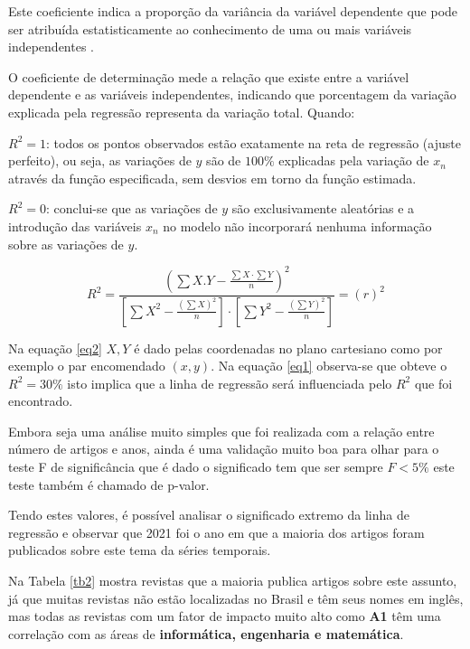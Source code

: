 Este coeficiente indica a proporção da variância da variável dependente que pode ser atribuída estatisticamente ao conhecimento de uma ou mais variáveis independentes . 

O coeficiente de determinação mede a relação que existe entre a variável dependente e as variáveis independentes, indicando que porcentagem da variação explicada pela regressão representa da variação total. Quando:

$R^2=1$: todos os pontos observados estão exatamente na reta de regressão (ajuste perfeito), ou seja, as variações de $y$ são de $100\%$ explicadas pela variação de $x_n$ através da função especificada, sem desvios em torno da função estimada. 

$R^2=0$: conclui-se que as variações de $y$ são exclusivamente aleatórias e a introdução das variáveis $x_n$ no modelo não incorporará nenhuma informação sobre as variações de $y$.

\begin{equation}
	R^{2}=\frac{\left(\sum X . Y-\frac{\sum X \cdot \sum Y}{n}\right)^{2}}{\left[\sum X^{2}-\frac{\left(\sum X\right)^{2}}{n}\right] \cdot\left[\sum Y^{2}-\frac{\left(\sum Y\right)^{2}}{n}\right]}=(r)^{2}\label{eq2}
\end{equation}

Na equação \eqref{eq2} $X,Y$ é dado pelas coordenadas no plano cartesiano como por exemplo o par encomendado $(x,y)$. 
Na equação \eqref{eq1} observa-se que obteve o $R^2=30\%$ isto implica que a linha de regressão será influenciada pelo $R^2$ que foi encontrado.

Embora seja uma análise muito simples que foi realizada com a relação entre número de artigos e anos, ainda é uma validação muito boa para olhar para o teste F de significância que é dado o significado tem que ser sempre $F<5\%$ este teste também é chamado de p-valor.

Tendo estes valores, é possível analisar o significado extremo da linha de regressão e observar que 2021 foi o ano em que a maioria dos artigos foram publicados sobre este tema da séries temporais.



Na Tabela \ref{tb2} mostra revistas que a maioria publica artigos sobre este assunto, já que muitas revistas não estão localizadas no Brasil e têm seus nomes em inglês, mas todas as revistas com um fator de impacto muito alto como \textbf{A1} têm uma correlação com as áreas de \textbf{informática, engenharia e matemática}.

